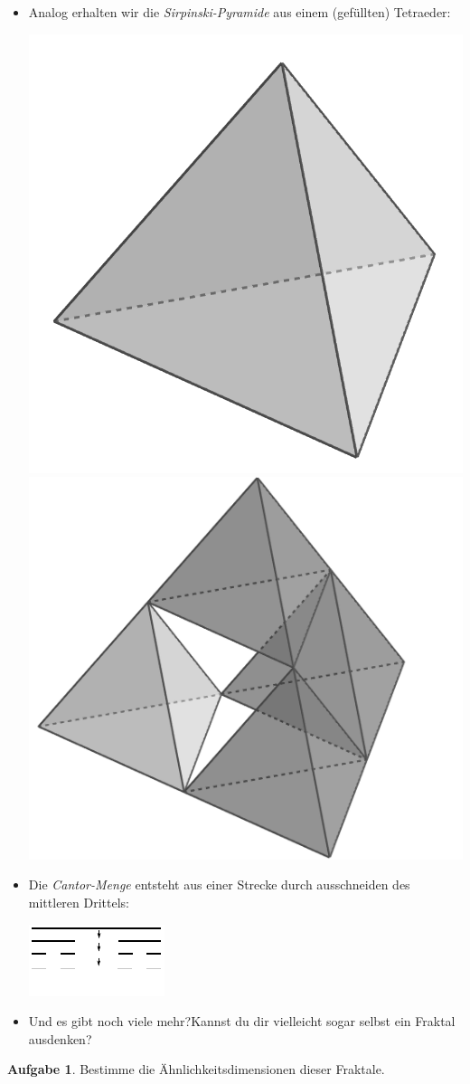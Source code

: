 \documentclass[a4paper,ngerman,12pt]{scrartcl}
\theoremstyle{definition}
\newtheorem{aufg}{Aufgabe}
\theoremstyle{plain}
\theoremstyle{remark}
\begin{document}
\begin{itemize}
	\item Analog erhalten wir die \emph{Sirpinski-Pyramide} aus einem (gefüllten) Tetraeder:
		\begin{center}
			\includegraphics[width=.3\textwidth]{Bilder/Tetraeder.png} \hspace{3em} \includegraphics[width=.3\textwidth]{Bilder/Sierpinski-Pyramide.png}
		\end{center}

	\item Die \emph{Cantor-Menge} entsteht aus einer Strecke durch ausschneiden des mittleren Drittels:
		\begin{center}
			\includegraphics[width=.5\textwidth]{Bilder/Cantor_Menge.pdf}
		\end{center}
	
	\item Und es gibt noch viele mehr?Kannst du dir vielleicht sogar selbst ein Fraktal ausdenken?	
\end{itemize}

\begin{aufg}
	Bestimme die Ähnlichkeitsdimensionen dieser Fraktale.
\end{aufg}
\end{document}
